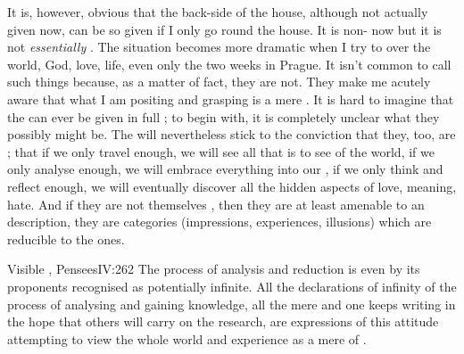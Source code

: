 It is, however, obvious that the back-side of the house, although not actually
given now, can be so given if I only go round the house. It is non-
now but it is not {\em essentially} . 
The situation becomes more dramatic when I try to  over the world,
God, love, life, even only the two weeks in Prague. It isn't common to call such
things  because, as 
a matter of fact, they are not. They make me acutely aware that what I am
positing and grasping is a mere . It is hard to imagine that the
 can ever be given in full ; to begin with, it
is completely unclear what they possibly might be. The  will nevertheless stick to the conviction that they, too, are
; that if we only travel enough, we will see all that is to see of
the world, if we only analyse enough, we will embrace everything into our
, if we only think and reflect enough, we will eventually
discover all the hidden aspects of love, meaning, hate. And if they are not
themselves , then they are at least amenable to an 
description, they are  categories (impressions, experiences, illusions)
which are reducible to the  ones. 


Visible , \citet{reasons, seen from afar, appear to limit our view;
  but when they are reached, we begin to see beyond.}{Pensees}{IV:262} The
process of analysis and reduction is even by its proponents recognised as
potentially infinite.  All the declarations of infinity of the process of
analysing and gaining knowledge, all the mere  and
 one keeps writing in the hope that others will carry on the
  research, 
are expressions of this attitude attempting to view the whole world and
experience as a mere  of . 

